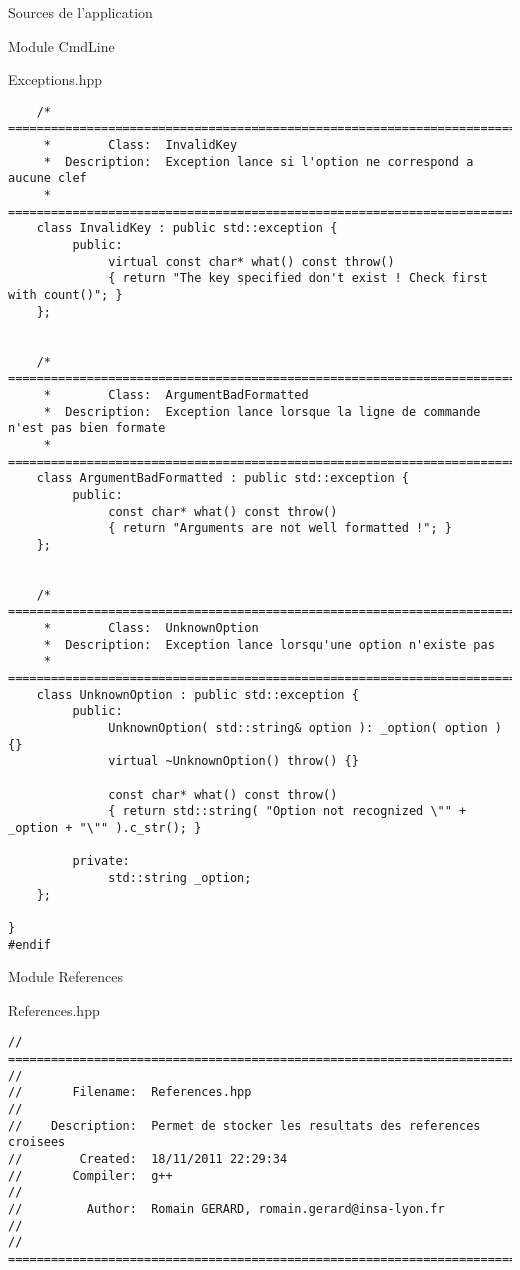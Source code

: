 \documentclass{article}
\begin{document}
\begin{section}{Sources de l'application}
\begin{subsection}{Module CmdLine}
\begin{paragraph}{Exceptions.hpp}
\begin{verbatim}
    /* =====================================================================================
     *        Class:  InvalidKey
     *  Description:  Exception lance si l'option ne correspond a aucune clef
     * =====================================================================================*/
    class InvalidKey : public std::exception {
         public:
              virtual const char* what() const throw()
              { return "The key specified don't exist ! Check first with count()"; }
    };


    /* =====================================================================================
     *        Class:  ArgumentBadFormatted
     *  Description:  Exception lance lorsque la ligne de commande n'est pas bien formate
     * =====================================================================================*/
    class ArgumentBadFormatted : public std::exception {
         public:
              const char* what() const throw()
              { return "Arguments are not well formatted !"; }
    };


    /* =====================================================================================
     *        Class:  UnknownOption
     *  Description:  Exception lance lorsqu'une option n'existe pas
     * =====================================================================================*/
    class UnknownOption : public std::exception {
         public:
              UnknownOption( std::string& option ): _option( option ) {}
              virtual ~UnknownOption() throw() {}

              const char* what() const throw()
              { return std::string( "Option not recognized \"" + _option + "\"" ).c_str(); }

         private:
              std::string _option;
    };

}
#endif
  \end{verbatim}
  \end{paragraph}

  \end{subsection}








  \begin{subsection}{Module References}
   
  \begin{paragraph}{References.hpp}
   \begin{verbatim}
// =====================================================================================
//
//       Filename:  References.hpp
//
//    Description:  Permet de stocker les resultats des references croisees
//        Created:  18/11/2011 22:29:34
//       Compiler:  g++
//
//         Author:  Romain GERARD, romain.gerard@insa-lyon.fr
//
// =====================================================================================



\end{verbatim}
\end{paragraph}
\end{subsection}
\end{section}
\end{document}
